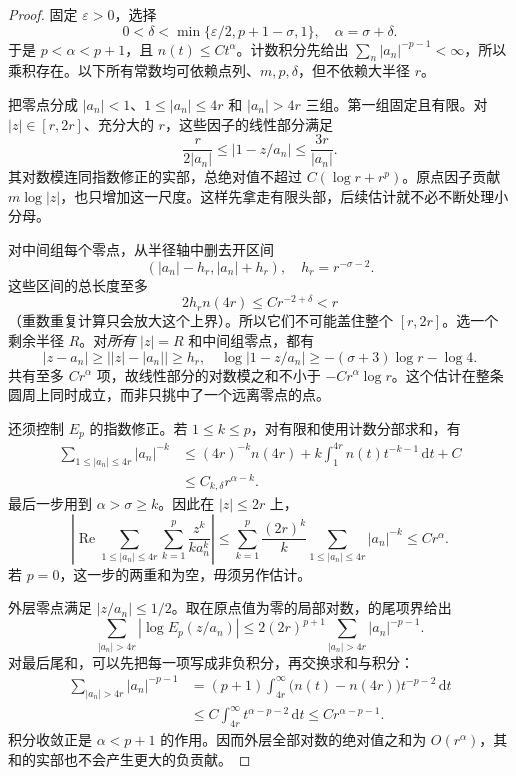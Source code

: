 \begin{proof}
固定 \(\varepsilon>0\)，选择
\[
 0<\delta<\min\{\varepsilon/2,p+1-\sigma,1\},
 \quad \alpha=\sigma+\delta.
\]
于是 \(p<\alpha<p+1\)，且 \(n(t)\le Ct^\alpha\)。计数积分先给出 \(\sum_n|a_n|^{-p-1}<\infty\)，所以乘积存在。以下所有常数均可依赖点列、\(m,p,\delta\)，但不依赖大半径 \(r\)。

把零点分成 \(|a_n|<1\)、\(1\le|a_n|\le4r\) 和 \(|a_n|>4r\) 三组。第一组固定且有限。对 \(|z|\in[r,2r]\)、充分大的 \(r\)，这些因子的线性部分满足
\[
 \frac{r}{2|a_n|}\le|1-z/a_n|\le\frac{3r}{|a_n|}.
\]
其对数模连同指数修正的实部，总绝对值不超过 \(C(\log r+r^p)\)。原点因子贡献 \(m\log|z|\)，也只增加这一尺度。这样先拿走有限头部，后续估计就不必不断处理小分母。

对中间组每个零点，从半径轴中删去开区间
\[
 (|a_n|-h_r,|a_n|+h_r),\quad h_r=r^{-\sigma-2}.
\]
这些区间的总长度至多
\[
 2h_r n(4r)\le Cr^{-2+\delta}<r
\]
（重数重复计算只会放大这个上界）。所以它们不可能盖住整个 \([r,2r]\)。选一个剩余半径 \(R\)。对\emph{所有} \(|z|=R\) 和中间组零点，都有
\[
 |z-a_n|\ge\bigl||z|-|a_n|\bigr|\ge h_r,
 \quad
 \log|1-z/a_n|\ge-(\sigma+3)\log r-\log4.
\]
共有至多 \(Cr^\alpha\) 项，故线性部分的对数模之和不小于 \(-Cr^\alpha\log r\)。这个估计在整条圆周上同时成立，而非只挑中了一个远离零点的点。

还须控制 \(E_p\) 的指数修正。若 \(1\le k\le p\)，对有限和使用计数分部求和，有
\[
 \begin{aligned}
 \sum_{1\le|a_n|\le4r}|a_n|^{-k}
 &\le (4r)^{-k}n(4r)
      +k\int_1^{4r}n(t)t^{-k-1}\,\mathrm{d}t+C\\
 &\le C_{k,\delta}r^{\alpha-k}.
 \end{aligned}
\]
最后一步用到 \(\alpha>\sigma\ge k\)。因此在 \(|z|\le2r\) 上，
\[
 \left|\operatorname{Re}
   \sum_{1\le|a_n|\le4r}\sum_{k=1}^p\frac{z^k}{k a_n^k}\right|
 \le\sum_{k=1}^p\frac{(2r)^k}{k}
       \sum_{1\le|a_n|\le4r}|a_n|^{-k}
 \le Cr^\alpha.
\]
若 \(p=0\)，这一步的两重和为空，毋须另作估计。

外层零点满足 \(|z/a_n|\le1/2\)。取在原点值为零的局部对数，的尾项界给出
\[
 \sum_{|a_n|>4r}|\log E_p(z/a_n)|
 \le 2(2r)^{p+1}\sum_{|a_n|>4r}|a_n|^{-p-1}.
\]
对最后尾和，可以先把每一项写成非负积分，再交换求和与积分：
\[
 \begin{aligned}
 \sum_{|a_n|>4r}|a_n|^{-p-1}
 &=(p+1)\int_{4r}^{\infty}
       \bigl(n(t)-n(4r)\bigr)t^{-p-2}\,\mathrm{d}t\\
 &\le C\int_{4r}^{\infty}t^{\alpha-p-2}\,\mathrm{d}t
 \le Cr^{\alpha-p-1}.
 \end{aligned}
\]
积分收敛正是 \(\alpha<p+1\) 的作用。因而外层全部对数的绝对值之和为 \(O(r^\alpha)\)，其和的实部也不会产生更大的负贡献。


\end{proof}
